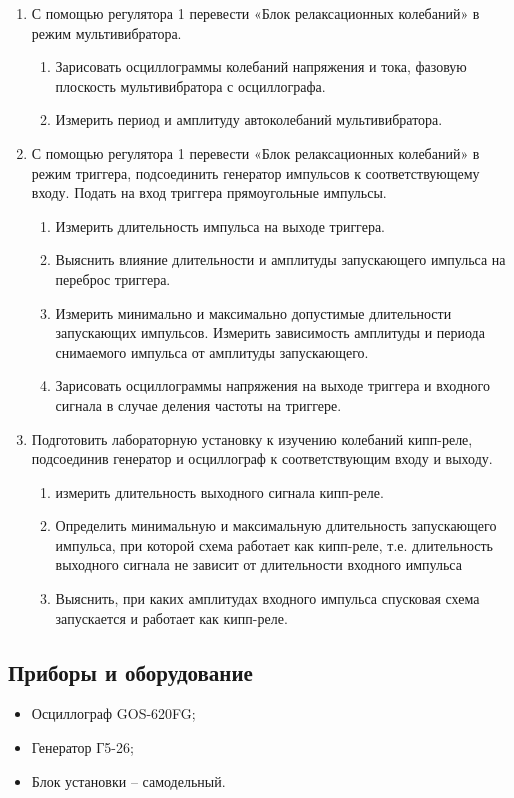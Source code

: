 \begin{enumerate}
	\item С помощью регулятора 1 перевести «Блок релаксационных колебаний» в режим мультивибратора.
	\begin{enumerate}
		\item[(a)] Зарисовать осциллограммы колебаний напряжения и тока, фазовую плоскость мультивибратора с осциллографа.
		\item[(b)] Измерить период и амплитуду автоколебаний мультивибратора.
	\end{enumerate}
	
	\item С помощью регулятора 1 перевести «Блок релаксационных колебаний» в режим триггера, подсоединить генератор импульсов к соответствующему входу. Подать на вход триггера прямоугольные импульсы.
	\begin{enumerate}
		\item[(a)] Измерить длительность импульса на выходе триггера.
		\item[(b)] Выяснить влияние длительности и амплитуды запускающего импульса на переброс триггера.
		\item[(c)] Измерить минимально и максимально допустимые длительности запускающих импульсов. Измерить зависимость амплитуды и периода снимаемого импульса от амплитуды запускающего.
		\item[(d)] Зарисовать осциллограммы напряжения на выходе триггера и входного сигнала в случае деления частоты на триггере.
	\end{enumerate}
	
	\item Подготовить лабораторную установку к изучению колебаний кипп-реле, подсоединив генератор и осциллограф к соответствующим входу и выходу.
	\begin{enumerate}
		\item[(a)] измерить длительность выходного сигнала кипп-реле.
		\item[(b)] Определить минимальную и максимальную длительность запускающего импульса, при которой схема работает как кипп-реле, т.е. длительность выходного сигнала не зависит от длительности входного импульса
		\item[(c)] Выяснить, при каких амплитудах входного импульса спусковая схема запускается и работает как кипп-реле.
	\end{enumerate}
\end{enumerate}

\subsection*{Приборы и оборудование} 
\begin{itemize}
	\item Осциллограф GOS-620FG;
	\item Генератор Г5-26;
	\item Блок установки -- самодельный.
\end{itemize}